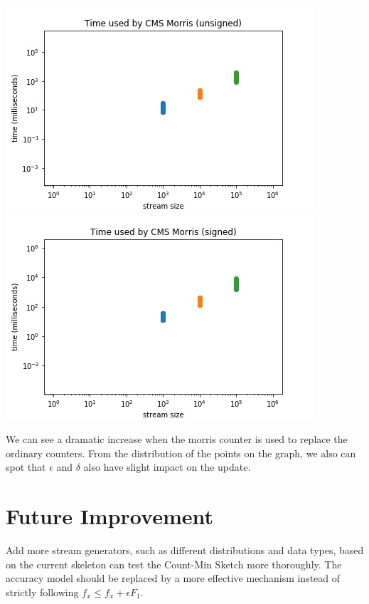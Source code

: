 \documentclass[a4paper, 11pt]{article}
\begin{document}
        \begin{center}
            \includegraphics[scale=0.5]{time_morris_unsigned}
            \includegraphics[scale=0.5]{time_morris_signed}
        \end{center}

        \noindent We can see a dramatic increase when the morris counter is used to replace the ordinary counters. From the distribution of the points on the graph, we also can spot that $\epsilon$ and $\delta$ also have slight impact on the update.
    \section{Future Improvement}
        Add more stream generators, such as different distributions and data types, based on the current skeleton can test the Count-Min Sketch more thoroughly. The accuracy model should be replaced by a more effective mechanism instead of strictly following $f_x \leq f_x + \epsilon F_1$.
\end{document}
